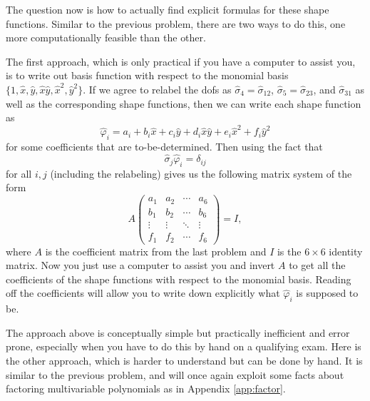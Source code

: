 \documentclass{article}
\theoremstyle{plain}
\theoremstyle{definition}
\theoremstyle{remark}
\begin{document}
\begin{enumerate}
	      The question now is how to actually find explicit formulas for these shape functions.
	      Similar to the previous problem, there are two ways to do this, one more computationally feasible than the other.

	      The first approach, which is only practical if you have a computer to assist you, is to write out basis function with respect to the monomial basis $\{1,\widehat x,\widehat y,\widehat x\widehat y,\widehat x^2,\widehat y^2\}$.
	      If we agree to relabel the dofs as $\widehat \sigma_4 = \widehat \sigma_{12}$, $\widehat \sigma_5 = \widehat \sigma_{23}$, and $\widehat \sigma_{31}$ as well as the corresponding shape functions, then we can write each shape function as
	      \[\widehat\varphi_i = a_i + b_i\widehat x + c_i \widehat y + d_i \widehat x\widehat y + e_i\widehat x^2 + f_i \widehat y^2\]
	      for some coefficients that are to-be-determined.
	      Then using the fact that \[\widehat \sigma_j \widehat\varphi_i = \delta_{ij}\] for all $i,j$ (including the relabeling) gives us the following matrix system of the form \[A\begin{pmatrix} a_1 & a_2 & \cdots & a_6 \\ b_1 & b_2 & \cdots & b_6 \\ \vdots & \vdots & \ddots & \vdots \\ f_1 & f_2 & \cdots & f_6 \end{pmatrix} = I,\]
	      where $A$ is the coefficient matrix from the last problem and $I$ is the $6\times 6$ identity matrix.
	      Now you just use a computer to assist you and invert $A$ to get all the coefficients of the shape functions with respect to the monomial basis.
	      Reading off the coefficients will allow you to write down explicitly what $\widehat\varphi_i$ is supposed to be.

	      The approach above is conceptually simple but practically inefficient and error prone, especially when you have to do this by hand on a qualifying exam.
	      Here is the other approach, which is harder to understand but can be done by hand.
	      It is similar to the previous problem, and will once again exploit some facts about factoring multivariable polynomials as in Appendix \ref{app:factor}.


\end{enumerate}
\end{document}
